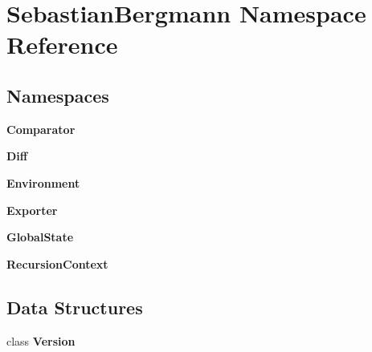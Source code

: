 \section{Sebastian\+Bergmann Namespace Reference}
\label{namespace_sebastian_bergmann}
\subsection*{Namespaces}
\begin{DoxyCompactItemize}
\item 
 {\bf Comparator}
\item 
 {\bf Diff}
\item 
 {\bf Environment}
\item 
 {\bf Exporter}
\item 
 {\bf Global\+State}
\item 
 {\bf Recursion\+Context}
\end{DoxyCompactItemize}
\subsection*{Data Structures}
\begin{DoxyCompactItemize}
\item 
class {\bf Version}
\end{DoxyCompactItemize}
